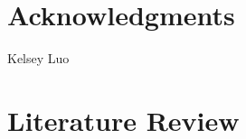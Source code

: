 \documentclass[edeposit,fullpage,11pt]{uiucthesis2018}
\title{\pygen}
\author{Samuel G. Dotson}
\begin{document}
\maketitle

\frontmatter
\begin{abstract}

Abstract.

\end{abstract}

\chapter*{Acknowledgments}

Kelsey Luo



\tableofcontents
\listoftables
\listoffigures


\pagebreak
\mainmatter

% 

\chapter{Literature Review}

\end{document}
